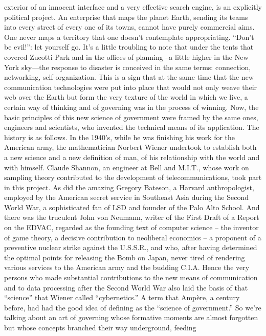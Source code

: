 \documentclass[landscape,twocolumn,letterpaper]{article}
\begin{document}
exterior of an innocent interface and a very effective search engine,
is an explicitly political project. An enterprise that maps the planet
Earth, sending its teams into every street of every one of its towns,
cannot have purely commercial aims. One never maps a territory that
one doesn’t contemplate appropriating. “Don’t be evil!”: let yourself
go. It’s a little troubling to note that under the tents that covered
Zucotti Park and in the offices of planning –a little higher in the
New York sky—the response to disaster is conceived in the same terms:
connection, networking, self-organization. This is a sign that at the
same time that the new communication technologies were put into place
that would not only weave their web over the Earth but form the very
texture of the world in which we live, a certain way of thinking and
of governing was in the process of winning. Now, the basic principles
of this new science of government were framed by the same ones,
engineers and scientists, who invented the technical means of its
application. The history is as follows. In the 1940’s, while he was
finishing his work for the American army, the mathematician Norbert
Wiener undertook to establish both a new science and a new definition
of man, of his relationship with the world and with himself. Claude
Shannon, an engineer at Bell and M.I.T., whose work on sampling theory
contributed to the development of telecommunications, took part in
this project. As did the amazing Gregory Bateson, a Harvard
anthropologist, employed by the American secret service in Southeast
Asia during the Second World War, a sophisticated fan of LSD and
founder of the Palo Alto School. And there was the truculent John von
Neumann, writer of the First Draft of a Report on the EDVAC, regarded
as the founding text of computer science – the inventor of game
theory, a decisive contribution to neoliberal economics – a proponent
of a preventive nuclear strike against the U.S.S.R., and who, after
having determined the optimal points for releasing the Bomb on Japan,
never tired of rendering various services to the American army and the
budding C.I.A. Hence the very persons who made substantial
contributions to the new means of communication and to data processing
after the Second World War also laid the basis of that “science” that
Wiener called “cybernetics.” A term that Ampère, a century before, had
had the good idea of defining as the “science of government.” So we’re
talking about an art of governing whose formative moments are almost
forgotten but whose concepts branched their way underground, feeding
\end{document}
